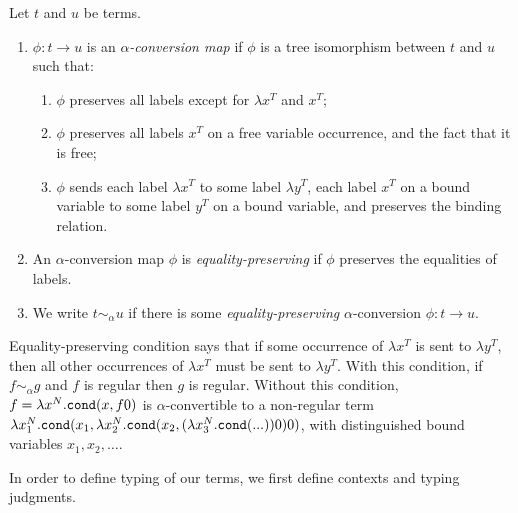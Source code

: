 \begin{definition}
\label{definition-alpha-conversion}
Let $t$ and $u$ be terms.
\begin{enumerate}
\item
$\phi:t \rightarrow u$ is an \emph{$\alpha$-conversion map} if  
$\phi$ is a tree isomorphism between $t$ and $u$ such that:
\begin{enumerate}
\item
$\phi$ preserves all labels except for $\lambda x^T$ and $x^T$;
\item 
$\phi$ preserves all labels $x^T$
on a free variable occurrence, and the fact that it is free;
\item
$\phi$ sends each label $\lambda x^T$ to some label $\lambda y^T$, each label $x^T$
on a bound variable to some label $y^T$ on a bound variable, and preserves the
binding relation. 
\end{enumerate}

\item
  An $\alpha$-conversion map $\phi$ is \emph{equality-preserving} 
  if $\phi$ preserves the equalities of labels. 
\item
We write $t \sim_\alpha u$ if there is some \emph{equality-preserving} 
$\alpha$-conversion $\phi:t \rightarrow u$.
\end{enumerate}
\end{definition}

Equality-preserving condition 
says that if some occurrence of $\lambda x^T$ is sent to $\lambda y^T$, then
all other occurrences of $\lambda x^T$ must be sent to $\lambda y^T$. 
With this condition, if $f \sim_\alpha g$ and $f$ is regular then $g$ is regular.
Without this condition, 
$f = \lambda x^{N}.{\tt cond}(x,f0)$ is $\alpha$-convertible to 
a non-regular term 
$\lambda x_1^{N}.{\tt cond}(x_1,\lambda x_2^{N}.{\tt cond}(x_2,(\lambda x_3^{N}.{\tt cond}(...))0)0)$,
with distinguished bound variables $x_1,x_2,\ldots$. 

In order to define typing of our terms, we first define contexts and typing judgments.


